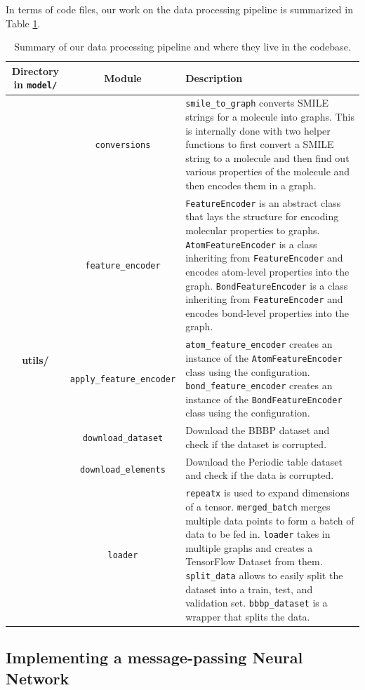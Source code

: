 \documentclass[fontsize=11pt]{article}
\begin{document}
In terms of code files, our work on the data processing pipeline is summarized in Table \ref{tab:dataprocess}.

\begin{table}[ht]
\centering
\caption{Summary of our data processing pipeline and where they live in the codebase.}
\label{tab:dataprocess}
\begin{tabularx}{\textwidth}{ccX}
\toprule
\textbf{Directory in \texttt{model/}} & \textbf{Module} & \textbf{Description}\\
\midrule
\multirow{16}{*}{\textbf{utils/}} & \texttt{conversions} & \texttt{smile\_to\_graph} converts SMILE strings for a molecule into graphs. This is internally done with two helper functions to first convert a SMILE string to a molecule and then find out various properties of the molecule and then encodes them in a graph.\\
&\texttt{feature\_encoder}& \texttt{FeatureEncoder} is an abstract class that lays the structure for encoding molecular properties to graphs. \texttt{AtomFeatureEncoder} is a class inheriting from \texttt{FeatureEncoder} and encodes atom-level properties into the graph. \texttt{BondFeatureEncoder} is a class inheriting from \texttt{FeatureEncoder} and encodes bond-level properties into the graph.\\
&\texttt{apply\_feature\_encoder}& \texttt{atom\_feature\_encoder} creates an instance of the \texttt{AtomFeatureEncoder} class using the configuration. \texttt{bond\_feature\_encoder} creates an instance of the \texttt{BondFeatureEncoder} class using the configuration.\\
\midrule
\multirow{8}{*}{\textbf{dataset/}} & \texttt{download\_dataset} & Download the BBBP dataset and check if the dataset is corrupted.\\
&\texttt{download\_elements}& Download the Periodic table dataset and check if the data is corrupted.\\
&\texttt{loader}& \texttt{repeatx} is used to expand dimensions of a tensor. \texttt{merged\_batch} merges multiple data points to form a batch of data to be fed in. \texttt{loader} takes in multiple graphs and creates a TensorFlow Dataset from them. \texttt{split\_data} allows to easily split the dataset into a train, test, and validation set. \texttt{bbbp\_dataset} is a wrapper that splits the data.\\
\bottomrule
\end{tabularx}
\end{table}

\subsection*{Implementing a message-passing Neural Network}
\end{document}

